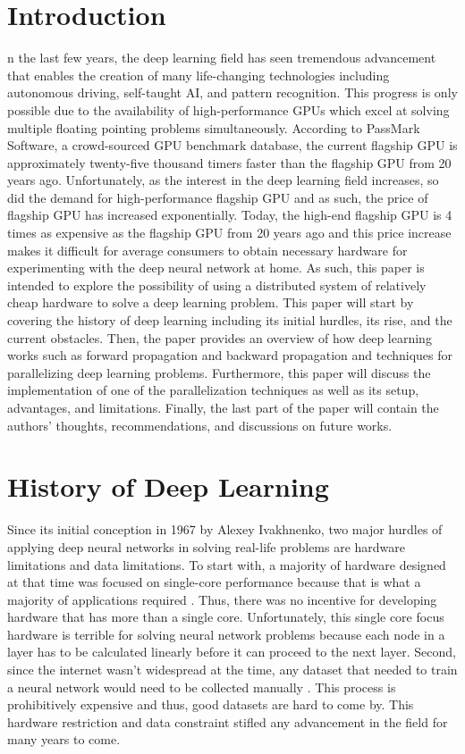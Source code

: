\documentclass{IEEEtran}
\begin{document}
    \section{Introduction}
        n the last few years, the deep learning field has seen tremendous advancement that enables the creation of many life-changing technologies including autonomous driving, self-taught AI, and pattern recognition. This progress is only possible due to the availability of high-performance GPUs which excel at solving multiple floating pointing problems simultaneously. According to PassMark Software, a crowd-sourced GPU benchmark database, the current flagship GPU is approximately twenty-five thousand timers faster than the flagship GPU from 20 years ago\cite{passmark_software}. Unfortunately, as the interest in the deep learning field increases, so did the demand for high-performance flagship GPU and as such, the price of flagship GPU has increased exponentially. Today, the high-end flagship GPU is 4 times as expensive as the flagship GPU from 20 years ago \cite{passmark_software} and this price increase makes it difficult for average consumers to obtain necessary hardware for experimenting with the deep neural network at home. As such, this paper is intended to explore the possibility of using a distributed system of relatively cheap hardware to solve a deep learning problem. This paper will start by covering the history of deep learning including its initial hurdles, its rise, and the current obstacles. Then, the paper provides an overview of how deep learning works such as forward propagation and backward propagation and techniques for parallelizing deep learning problems. Furthermore, this paper will discuss the implementation of one of the parallelization techniques as well as its setup, advantages, and limitations. Finally, the last part of the paper will contain the authors’ thoughts, recommendations, and discussions on future works.
    
    \section{History of Deep Learning}
        Since its initial conception in 1967 by Alexey Ivakhnenko, two major hurdles of applying deep neural networks in solving real-life problems are hardware limitations and data limitations. To start with, a majority of hardware designed at that time was focused on single-core performance because that is what a majority of applications required \cite{inproceedings}. Thus, there was no incentive for developing hardware that has more than a single core. Unfortunately, this single core focus hardware is terrible for solving neural network problems because each node in a layer has to be calculated linearly before it can proceed to the next layer. Second, since the internet wasn’t widespread at the time, any dataset that needed to train a neural network would need to be collected manually \cite{pew_research_center}. This process is prohibitively expensive and thus, good datasets are hard to come by. This hardware restriction and data constraint stifled any advancement in the field for many years to come.
\end{document}
